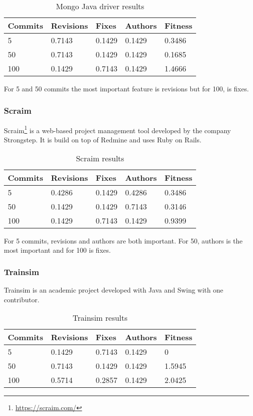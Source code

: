 \begin{table}[H]
    \centering
    \caption{Mongo Java driver results}
    \label{table:learning_mongojavadriver}
    \begin{tabular}{|l|l|l|l|l|}
        \hline
        Commits & Revisions & Fixes & Authors & Fitness \\ \hline
        5 & 0.7143 & 0.1429 & 0.1429 & 0.3486 \\ \hline
        50 & 0.7143 & 0.1429 & 0.1429 & 0.1685 \\ \hline
        100 & 0.1429 & 0.7143  & 0.1429 & 1.4666 \\ \hline
    \end{tabular}
\end{table}

For 5 and 50 commits the most important feature is revisions but for 100, is
fixes.

\subsubsection{Scraim}
Scraim\footnote{\url{https://scraim.com/}} is a web-based project management
tool developed by the company Strongstep. It is build on top of Redmine and
uses Ruby on Rails.

\begin{table}[H]
    \centering
    \caption{Scraim results}
    \label{table:learning_scraim}
    \begin{tabular}{|l|l|l|l|l|}
        \hline
        Commits & Revisions & Fixes & Authors & Fitness \\ \hline
        5         & 0.4286     & 0.1429 & 0.4286   & 0.3486 \\ \hline
        50        & 0.1429 & 0.1429 & 0.7143   & 0.3146 \\ \hline
        100       & 0.1429     & 0.7143  & 0.1429    & 0.9399 \\ \hline
    \end{tabular}
\end{table}
For 5 commits, revisions and authors are both important. For 50, authors is the
most important and for 100 is fixes.

\subsubsection{Trainsim}
Trainsim is an academic project developed with Java and Swing with one
contributor.

\begin{table}[H]
    \centering
    \caption{Trainsim results}
    \label{table:learning_trainsim}
    \begin{tabular}{|l|l|l|l|l|}
        \hline
        Commits & Revisions & Fixes & Authors & Fitness \\ \hline
        5         & 0.1429     & 0.7143 & 0.1429   & 0 \\ \hline
        50        & 0.7143 & 0.1429 & 0.1429   & 1.5945 \\ \hline
        100       & 0.5714     & 0.2857  & 0.1429    & 2.0425 \\ \hline
    \end{tabular}
\end{table}

